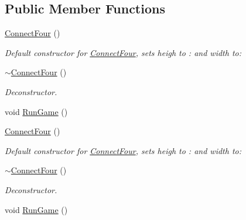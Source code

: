 \subsection*{Public Member Functions}
\begin{DoxyCompactItemize}
\item 
\hyperlink{classConnectFour_a9d7a0db424f22513386fa60ed2d5b575}{Connect\-Four} ()
\begin{DoxyCompactList}\small\item\em Default constructor for \hyperlink{classConnectFour}{Connect\-Four}, sets heigh to \-: and width to\-: \end{DoxyCompactList}\item 
\hypertarget{classConnectFour_ae7d414d7f7f694fd427bfeaef80bd1f9}{\hyperlink{classConnectFour_ae7d414d7f7f694fd427bfeaef80bd1f9}{$\sim$\-Connect\-Four} ()}\label{classConnectFour_ae7d414d7f7f694fd427bfeaef80bd1f9}

\begin{DoxyCompactList}\small\item\em Deconstructor. \end{DoxyCompactList}\item 
void \hyperlink{classConnectFour_a1e58549ad7980f6a1311c92f5e67e62c}{Run\-Game} ()
\item 
\hypertarget{classConnectFour_a9d7a0db424f22513386fa60ed2d5b575}{\hyperlink{classConnectFour_a9d7a0db424f22513386fa60ed2d5b575}{Connect\-Four} ()}\label{classConnectFour_a9d7a0db424f22513386fa60ed2d5b575}

\begin{DoxyCompactList}\small\item\em Default constructor for \hyperlink{classConnectFour}{Connect\-Four}, sets heigh to \-: and width to\-: \end{DoxyCompactList}\item 
\hypertarget{classConnectFour_ae7d414d7f7f694fd427bfeaef80bd1f9}{\hyperlink{classConnectFour_ae7d414d7f7f694fd427bfeaef80bd1f9}{$\sim$\-Connect\-Four} ()}\label{classConnectFour_ae7d414d7f7f694fd427bfeaef80bd1f9}

\begin{DoxyCompactList}\small\item\em Deconstructor. \end{DoxyCompactList}\item 
void \hyperlink{classConnectFour_a1e58549ad7980f6a1311c92f5e67e62c}{Run\-Game} ()
\end{DoxyCompactItemize}


